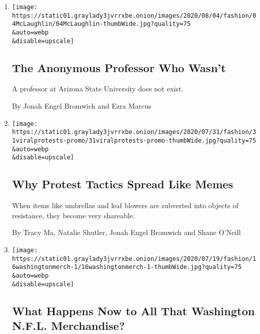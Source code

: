 \begin{enumerate}
\def\labelenumi{\arabic{enumi}.}
\item
  \href{/2020/08/04/style/college-coronavirus-hoax.html}{}

  \texttt{[image: https://static01.graylady3jvrrxbe.onion/images/2020/08/04/fashion/04McLaughlin/04McLaughlin-thumbWide.jpg?quality=75\\\&auto=webp\\\&disable=upscale]}

  \hypertarget{the-anonymous-professor-who-wasnt}{%
  \subsection{The Anonymous Professor Who
  Wasn't}\label{the-anonymous-professor-who-wasnt}}

  A professor at Arizona State University does not exist.

  By Jonah Engel Bromwich and Ezra Marcus
\item
  \href{/2020/07/31/style/viral-protest-videos.html}{}

  \texttt{[image: https://static01.graylady3jvrrxbe.onion/images/2020/07/31/fashion/31viralprotests-promo/31viralprotests-promo-thumbWide.jpg?quality=75\\\&auto=webp\\\&disable=upscale]}

  \hypertarget{why-protest-tactics-spread-like-memes}{%
  \subsection{Why Protest Tactics Spread Like
  Memes}\label{why-protest-tactics-spread-like-memes}}

  When items like umbrellas and leaf blowers are subverted into objects
  of resistance, they become very shareable.

  By Tracy Ma, Natalie Shutler, Jonah Engel Bromwich and Shane O'Neill
\item
  \href{/2020/07/16/style/washington-redskins-name-change-merchandise.html}{}

  \texttt{[image: https://static01.graylady3jvrrxbe.onion/images/2020/07/19/fashion/16washingtonmerch-1/16washingtonmerch-1-thumbWide.jpg?quality=75\\\&auto=webp\\\&disable=upscale]}

  \hypertarget{what-happens-now-to-all-that-washington-nfl-merchandise}{%
  \subsection{What Happens Now to All That Washington N.F.L.
  Merchandise?}\label{what-happens-now-to-all-that-washington-nfl-merchandise}}


\end{enumerate}
